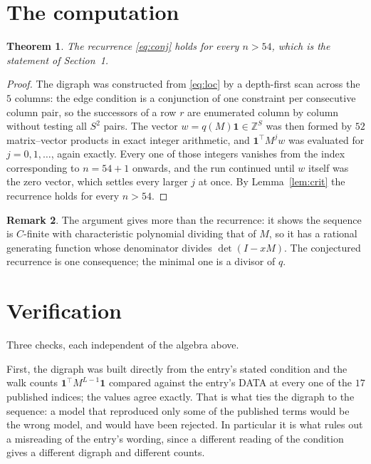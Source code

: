 \documentclass[11pt,a4paper]{article}
\theoremstyle{plain}
\newtheorem{theorem}{Theorem}
\theoremstyle{definition}
\newtheorem{remark}[theorem]{Remark}
\begin{document}
\section{The computation}

\begin{theorem}
The recurrence \eqref{eq:conj} holds for every $n>54$, which is the statement of
Section~1.
\end{theorem}

\begin{proof}
The digraph was constructed from \eqref{eq:loc} by a depth-first scan across the $5$
columns: the edge condition is a conjunction of one constraint per consecutive column
pair, so the successors of a row $r$ are enumerated column by column without testing all
$S^2$ pairs. The vector $w=q(M)\mathbf{1}\in\mathbb{Z}^{S}$ was then formed by $52$
matrix--vector products in exact integer arithmetic, and $\mathbf{1}^{\!\top}M^{j}w$ was
evaluated for $j=0,1,\dots$, again exactly. Every one of those integers vanishes from the
index corresponding to $n=54+1$ onwards, and the run continued until $w$ itself was the
zero vector, which settles every larger $j$ at once. By Lemma~\ref{lem:crit} the recurrence
holds for every $n>54$.
\end{proof}

\begin{remark}
The argument gives more than the recurrence: it shows the sequence is $C$-finite with
characteristic polynomial dividing that of $M$, so it has a rational generating function
whose denominator divides $\det(I-xM)$. The conjectured recurrence is one consequence; the
minimal one is a divisor of $q$.
\end{remark}

\section{Verification}

Three checks, each independent of the algebra above.

First, the digraph was built directly from the entry's stated condition and the walk counts
$\mathbf{1}^{\!\top}M^{L-1}\mathbf{1}$ compared against the entry's DATA at
every one of the $17$ published indices; the values agree exactly. That is what ties
the digraph to the sequence: a model that reproduced only some of the published terms would
be the wrong model, and would have been rejected. In particular it is what rules out a
misreading of the entry's wording, since a different reading of the condition gives a
different digraph and different counts.
\end{document}

